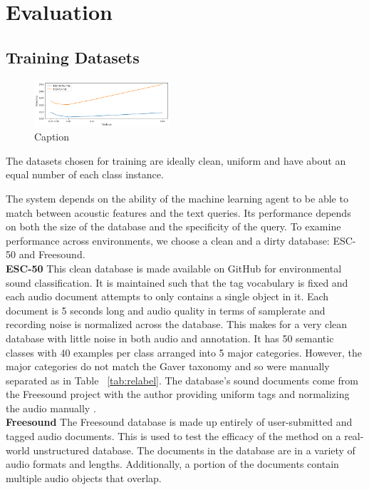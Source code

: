 \section{Evaluation}

\subsection{Training Datasets}
\begin{figure}
    \centering
    \includegraphics[width=0.45\textwidth]{figures/dataset-load-time.png}
    \caption{Caption}
    \label{fig:load-time}
\end{figure}

The datasets chosen for training are ideally clean, uniform and have about an equal number of each class instance. 

The system depends on the ability of the machine learning agent to be able to
match between acoustic features and the text queries. Its performance depends on
both the size of the database and the specificity of the query. To examine
performance across environments, we choose a clean and a dirty database: ESC-50
\cite{Piczak2015} and Freesound.
\\
\textbf{ESC-50} This clean database is made available on GitHub for environmental sound
classification. It is maintained such that the tag vocabulary is fixed and each
audio document attempts to only contains a single object in it. Each document is
5 seconds long and audio quality in terms of samplerate and recording noise is
normalized across the database. This makes for a very clean database with little
noise in both audio and annotation. It has 50 semantic classes with 40 examples
per class arranged into 5 major categories. However, the major categories do not
match the Gaver taxonomy and so were manually separated as in Table
~\cref{tab:relabel}. The database's sound documents come from the Freesound
project with the author providing uniform tags and normalizing the audio
manually \cite{Font2013}.
\\
\textbf{Freesound} The Freesound database is made up entirely of user-submitted and tagged audio documents. This is used to test the efficacy of the method on a real-world unstructured database. The documents in the database are in a variety of audio formats and lengths. Additionally, a portion of the documents contain multiple audio objects that overlap.

